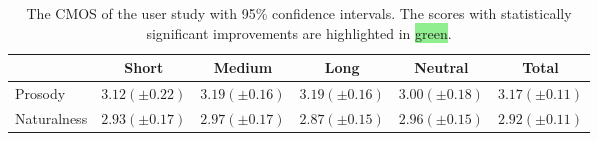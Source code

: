 \begin{table}[t]
    \centering
    \caption{The CMOS of the user study with 95\% confidence intervals. The scores with statistically significant improvements are highlighted in \colorbox{lightgreen}{green}.}
    \vspace{-2mm}
    \begin{tabular}{l c c c c c}
        \toprule
         & Short & Medium & Long & Neutral & Total \\
        \midrule
        Prosody & $3.12 (\pm 0.22)$ & \cellcolor{lightgreen}$3.19 (\pm 0.16)$ & \cellcolor{lightgreen} $3.19 (\pm 0.16)$ & $3.00 (\pm 0.18)$ & \cellcolor{lightgreen} $3.17 (\pm 0.11)$ \\
        Naturalness & $2.93 (\pm 0.17)$ & $2.97 (\pm 0.17)$ & $2.87 (\pm 0.15)$ & $2.96 (\pm 0.15)$ & $2.92 (\pm 0.11)$ \\
        \bottomrule
    \end{tabular}
    \label{tab:user_study}
    \vspace{-2mm}
\end{table}
